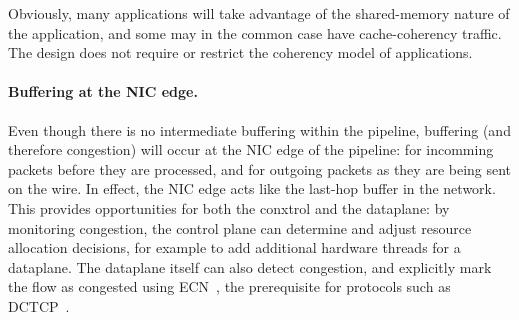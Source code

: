 Obviously, many applications will take advantage of the shared-memory
nature of the application, and some may in the common case have
cache-coherency traffic.  The design does not require or restrict the coherency model of applications.

\paragraph{Buffering at the NIC edge.}

Even though there is no intermediate buffering within the pipeline,
buffering (and therefore congestion) will occur at the NIC edge of the
pipeline: for incomming packets before they are processed, and for
outgoing packets as they are being sent on the wire.  In effect, the
NIC edge acts like the last-hop buffer in the network.  This provides
opportunities for both the conxtrol and the dataplane: by monitoring
congestion, the control plane can determine and adjust resource
allocation decisions, for example to add additional hardware threads
for a dataplane.  The dataplane itself can also detect congestion, and
explicitly mark the flow as congested using ECN~\cite{ramakrishnan2001addition}, the
prerequisite for protocols such as
DCTCP~\cite{DBLP:conf/sigcomm/AlizadehGMPPPSS10}. 

